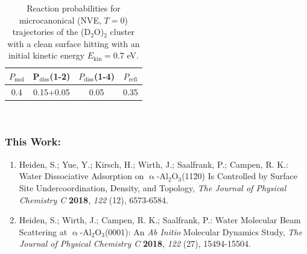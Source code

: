\documentclass[11pt,DIV=13,BCOR=5mm,a4paper,headinclude]{scrbook}
\begin{document}
\begin{table}[!h]
 \centering
  \caption{Reaction probabilities for microcanonical (NVE, $T=0$) 
 trajectories of the (D$_2$O)$_2$ cluster with a clean surface 
 hitting with an initial kinetic energy $E_\textrm{kin}=0.7$ eV.}
 \begin{tabular}{cccc}
\toprule
$P_\textrm{mol}$ & P$_\textrm{diss}$(1-2) &  $P_\textrm{diss}$(1-4) & $P_\textrm{refl}$ \\\midrule
0.4&0.15+0.05 & 0.05&0.35\\\bottomrule
\end{tabular}
 \label{tab:2D2O-prob}
\end{table}

\begingroup
\renewcommand{\cleardoublepage}{}
~
\clearpage
~
\clearpage
{}
\endgroup

\subsubsection{This Work:}

\begin{enumerate}[itemsep=0.25\baselineskip]
  \item Heiden, S.; Yue, Y.; Kirsch, H.; Wirth, J.; Saalfrank, P.; Campen, R. K.: {\frqq}Water Dissociative Adsorption on $\upalpha$-Al$_2$O$_3$(11\=20) Is Controlled by Surface Site Undercoordination, Density, and Topology{\flqq}, \textit{The Journal of Physical Chemistry C} \textbf{2018}, \textit{122} (12), 6573-6584.
  \item Heiden, S.; Wirth, J.; Campen, R. K.; Saalfrank, P.: {\frqq}Water Molecular Beam Scattering at $\upalpha$-Al$_2$O$_3$(0001): An \textit{Ab Initio} Molecular Dynamics Study{\flqq}, \textit{The Journal of Physical Chemistry C} \textbf{2018}, \textit{122} (27), 15494-15504.

\end{enumerate}
\end{document}
